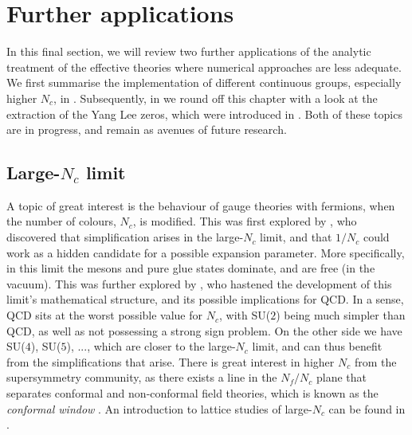 \section{Further applications}

In this final section, we will review two further applications of the analytic
treatment of the effective theories where numerical approaches are less
adequate.  We first summarise the implementation of different continuous groups,
especially higher $N_c$, in . Subsequently, in
 we round off this chapter with a look at the
extraction of the Yang Lee zeros, which were introduced in
. Both of these topics are in progress, and
remain as avenues of future research.

\subsection{Large-\texorpdfstring{$N_c$}{Nc} limit} \label{sec:large_nc_study}

A topic of great interest is the behaviour of gauge theories with
fermions, when the number of colours, $N_c$, is modified.  This was first
explored by \cite{'tHooft:1973jz}, who discovered that simplification
arises in the large-$N_c$ limit, and that $1/N_c$ could work as a hidden
candidate for a possible expansion parameter. More specifically, in this limit
the mesons and pure glue states dominate, and are free (in the vacuum). This was
further explored by \cite{Witten:1979kh}, who hastened the development
of this limit's mathematical structure, and its possible implications for QCD.
In a sense, QCD sits at the worst possible value for $N_c$, with SU($2$) being
much simpler than QCD, as well as not possessing a strong sign problem. On the
other side we have SU($4$), SU($5$), ..., which are closer to the large-$N_c$
limit, and can thus benefit from the simplifications that arise. There is great
interest in higher $N_c$ from the supersymmetry community, as there exists a
line in the $N_f \big/ N_c$ plane that separates conformal and non-conformal
field theories, which is known as the \emph{conformal window}
\citep{Dietrich:2006cm}. An introduction to lattice studies of large-$N_c$ can
be found in \citep{Lucini:2013qja}.

